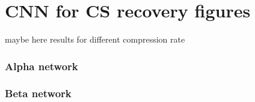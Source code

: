 \appendix
\chapter{CNN for CS recovery figures}
maybe here results for different compression rate
\subsection{Alpha network}

\subsection{Beta network}


